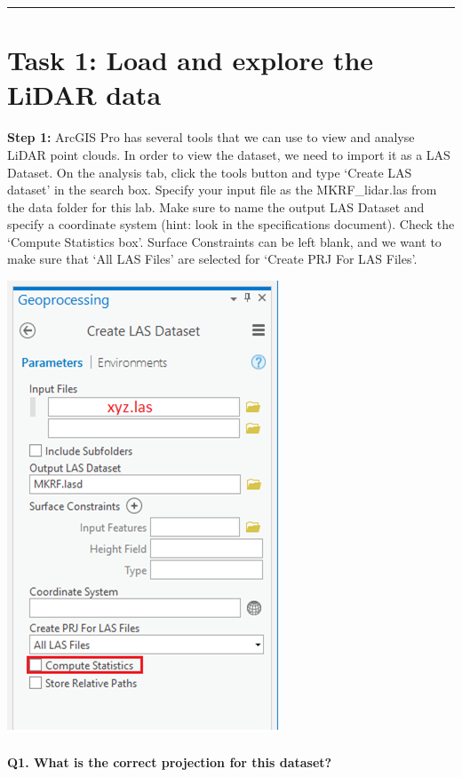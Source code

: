 \documentclass[
]{book}
\begin{document}
\begin{center}\rule{0.5\linewidth}{0.5pt}\end{center}

\hypertarget{task-1-load-and-explore-the-lidar-data}{%
\section*{Task 1: Load and explore the LiDAR data}\label{task-1-load-and-explore-the-lidar-data}}

\textbf{Step 1:} ArcGIS Pro has several tools that we can use to view and analyse LiDAR point clouds. In order to view the dataset, we need to import it as a LAS Dataset. On the analysis tab, click the tools button and type `Create LAS dataset' in the search box. Specify your input file as the MKRF\_lidar.las from the data folder for this lab. Make sure to name the output LAS Dataset and specify a coordinate system (hint: look in the specifications document). Check the `Compute Statistics box'. Surface Constraints can be left blank, and we want to make sure that `All LAS Files' are selected for `Create PRJ For LAS Files'.

\begin{center}\includegraphics[width=0.4\linewidth]{images/04-creating-las-dataset} \end{center}

\hypertarget{q1.-what-is-the-correct-projection-for-this-dataset}{%
\paragraph*{Q1. What is the correct projection for this dataset?}\label{q1.-what-is-the-correct-projection-for-this-dataset}}
\end{document}
